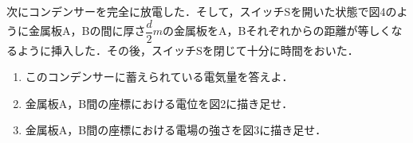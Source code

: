 次にコンデンサーを完全に放電した．そして，スイッチSを開いた状態で図4のように金属板A，Bの間に厚さ$\dfrac{d}{2}\unit{m}$の金属板をA，Bそれぞれからの距離が等しくなるように挿入した．その後，スイッチSを閉じて十分に時間をおいた．
\begin{enumerate}[（1）]
  \setlength{\leftskip}{-1.5zw}
  \setlength{\itemindent}{1zw}\setlength{\labelsep}{0.5zw}
  \setlength{\labelwidth}{1zw}\setlength{\leftmargin}{1zw}
  \setlength{\itemsep}{0.5\baselineskip}
  \addtocounter{enumi}{3}
  \item このコンデンサーに蓄えられている電気量を答えよ．
  \item 金属板A，B間の座標\x における電位を図2に描き足せ．
  \item 金属板A，B間の座標\x における電場の強さを図3に描き足せ．
\end{enumerate}

